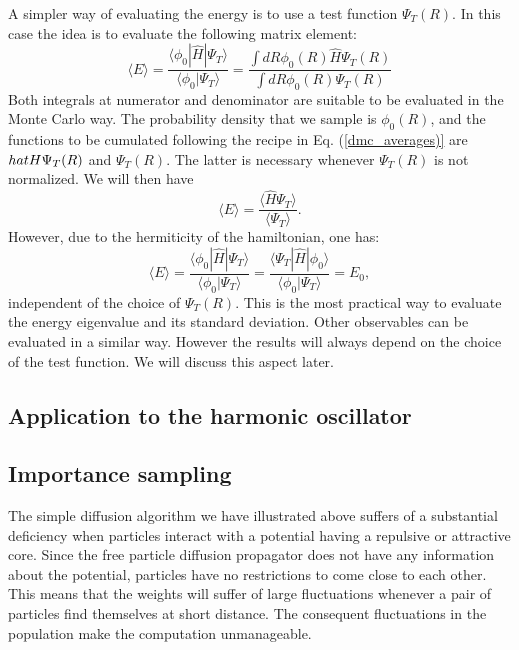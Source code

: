 A simpler way of evaluating the energy is to use a test function $\Psi_T(R)$. In this case the idea is
to evaluate the following matrix element:
\begin{equation}
\langle E\rangle =\frac{\langle \phi_0|\hat{H}|\Psi_T\rangle}{\langle \phi_0|\Psi_T\rangle}=\frac{\int dR \phi_0(R)\hat{H}\Psi_T(R)}{\int dR \phi_0(R)\Psi_T(R)}
\end{equation}
Both integrals at numerator and denominator are suitable to be evaluated in the Monte Carlo way.
The probability density that we sample is $\phi_0(R)$, and the functions to be cumulated following the recipe in Eq. (\ref{dmc_averages)} are $\\hat{H}\Psi_T(R)$ and $\Psi_T(R)$. The latter is necessary whenever $\Psi_T(R)$ is not normalized. We will then have
\begin{equation}
\langle E\rangle=\frac{\langle \hat{H}\Psi_T\rangle}{\langle \Psi_T\rangle}.
\end{equation}
However, due to the hermiticity of the hamiltonian, one has:
\begin{equation}
\langle E\rangle =\frac{\langle \phi_0|\hat{H}|\Psi_T\rangle}{\langle \phi_0|\Psi_T\rangle}=\frac{\langle \Psi_T|\hat{H}|\phi_0\rangle}{\langle \phi_0|\Psi_T\rangle}=E_0,
\end{equation}
independent of the choice of $\Psi_T(R)$. This is the most practical way to evaluate the energy eigenvalue and its standard deviation. Other observables can be evaluated in a similar way. However the results will always depend on the choice of the test function. We will discuss this aspect later.
\subsection{Application to the harmonic oscillator}
\subsection{Importance sampling}
The simple diffusion algorithm we have illustrated above suffers of a substantial deficiency when particles interact with a potential having a repulsive or attractive core. Since the free particle diffusion propagator does not have any information about the potential, particles have no restrictions to come close to each other. This means that the weights will suffer of large fluctuations whenever a pair of particles find themselves at short distance. The consequent fluctuations in the population make the computation unmanageable.  

